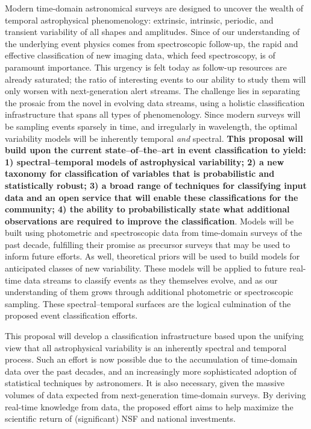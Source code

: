 
Modern time-domain astronomical surveys are designed to uncover the wealth of
temporal astrophysical phenomenology: extrinsic, intrinsic, periodic, and
transient variability of all shapes and amplitudes.  Since of our understanding
of the underlying event physics comes from spectroscopic follow-up, the
rapid and effective classification of new imaging data, which feed spectroscopy, is of paramount importance. This urgency is felt today as follow-up resources are already saturated; the
ratio of interesting events to our ability to study them will only worsen
with next-generation alert streams. The challenge lies in separating the
prosaic from the novel in evolving data streams, using a holistic classification
infrastructure that spans all types of phenomenology. Since modern surveys will
be sampling events sparsely in time, and irregularly in wavelength, the optimal
variability models will be inherently temporal {\it and} spectral.  {\bf This
proposal will build upon the current state--of--the--art in event classification
to yield: 1) spectral--temporal models of astrophysical variability; 2) a new
taxonomy for classification of variables that is probabilistic and statistically
robust; 3) a broad range of techniques for classifying input data and an open
service that will enable these classifications for the community;  4) the
ability to probabilistically state what additional observations are required to
improve the classification}. Models will be built using photometric and
spectroscopic data from time-domain surveys of the past decade, fulfilling
their promise as precursor surveys that may be used to inform future efforts. As
well, theoretical priors will be used to build models for anticipated classes of
new variability.  These models will be applied to future real-time data streams
to classify events as they themselves evolve, and as our understanding of them
grows through additional photometric or spectroscopic sampling.   These
spectral--temporal surfaces are the logical culmination of the proposed event classification
efforts.

\bigskip \centerline{}

This proposal will develop a classification infrastructure based upon the
unifying view that all astrophysical variability is an inherently spectral and
temporal process.  Such an effort is now possible due to the accumulation of
time-domain data over the past decades, and an increasingly more sophisticated
adoption of statistical techniques by astronomers. It is also necessary, given
the massive volumes of data expected from next-generation time-domain surveys. 
By deriving real-time knowledge from data, the proposed effort 
aims to help maximize the scientific return of (significant) NSF and national investments.

